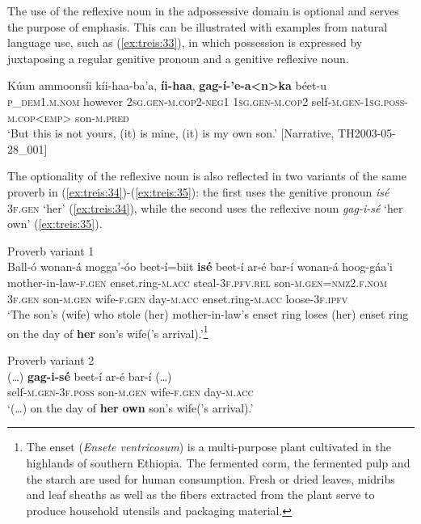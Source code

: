 \documentclass[output=paper]{langscibook}
\begin{document}
The use of the reflexive noun in the adpossessive domain is optional and serves the purpose of emphasis. This can be illustrated with examples from natural language use, such as (\ref{ex:treis:33}), in which possession is expressed by juxtaposing a regular genitive pronoun and a genitive reflexive noun. 

\ea\label{ex:treis:33} 
\gll Kúun ammoonsíi kíi-haa-ba’a, \textbf{íi-haa}, \textbf{gag-í-’e-a<n>ka} béet-u\\
     \textsc{p\_dem1.m.nom} however \textsc{2sg.gen-m.cop2-neg1} \textsc{1sg.gen-m.cop2} self-\textsc{m.gen-1sg.poss-m.cop<emp>} son-\textsc{m.pred}\\
\glt ‘But this is not yours, (it) is mine, (it) is my own son.’ [Narrative, TH2003-05-28\_001]\z

The optionality of the reflexive noun is also reflected in two variants of the same proverb in (\ref{ex:treis:34})-(\ref{ex:treis:35}): the first uses the genitive pronoun \textit{isé} 3\textsc{f.gen} ‘her’ (\ref{ex:treis:34}), while the second uses the reflexive noun \textit{gag-i-sé} ‘her own’ (\ref{ex:treis:35}).

\ea\label{ex:treis:34} Proverb variant 1 \\
\gll Ball-ó wonan-á mogga’-óo beet-í=biit \textbf{isé} beet-í ar-é bar-í wonan-á hoog-gáa’i\\
     mother-in-law-\textsc{f.gen} enset.ring-\textsc{m.acc} steal-\textsc{3f.pfv.rel} son-\textsc{m.gen=nmz2.f.nom} \textsc{3f.gen} son-\textsc{m.gen} wife-\textsc{f.gen} day-\textsc{m.acc} enset.ring-\textsc{m.acc} loose-\textsc{3f.ipfv}\\
\glt ‘The son’s (wife) who stole (her) mother-in-law’s enset ring loses (her) enset ring on the day of \textbf{her} son’s wife(’s arrival).’\footnote{The enset (\textit{Ensete ventricosum}) is a multi-purpose plant cultivated in the highlands of southern Ethiopia. The fermented corm, the fermented pulp and the starch are used for human consumption. Fresh or dried leaves, midribs and leaf sheaths as well as the fibers extracted from the plant serve to produce household utensils and packaging material.} \citep[28]{Geetaahun2002}\z

\ea\label{ex:treis:35} Proverb variant 2 \\
\gll (…) \textbf{gag-i-sé} beet-í ar-é {bar-í (…)}\\
     {} self-\textsc{m.gen-3f.poss} son-\textsc{m.gen} wife-\textsc{f.gen} day-\textsc{m.acc}\\
\glt ‘(…) on the day of \textbf{her} \textbf{own} son’s wife(’s arrival).’ \citep[24]{AlamuAlamaayo2017}\z
\end{document}
